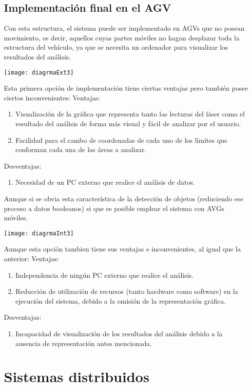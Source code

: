 \subsection{Implementación final en el AGV}
Con esta estructura, el sistema puede ser implementado en AGVs que no posean movimiento, es decir, aquellos cuyas partes móviles no hagan desplazar toda la estructura del vehículo, ya que se necesita un ordenador para visualizar los resultados del análisis.

\texttt{[image: diagrmaExt3]}

Esta primera opción de implementación tiene ciertas ventajas pero también posee ciertos inconvenientes:
Ventajas:
\begin{enumerate}
	\item Visualización de la gráfica que representa tanto las lecturas del láser como el resultado del análisis de forma más visual y fácil de analizar por el usuario.
	\item Facilidad para el cambo de coordenadas de cada uno de los límites que conforman cada una de las áreas a analizar.
\end{enumerate}
Desventajas:
\begin{enumerate}
	\item Necesidad de un PC externo que realice el análisis de datos.
\end{enumerate}

Aunque si se obvia esta característica de la detección de objetos (reduciendo ese proceso a datos booleanos) si que es posible emplear el sistema con AVGs móviles.

\texttt{[image: diagrmaInt3]}

Aunque esta opción tambien tiene sus ventajas e inconvenientes, al igual que la anterior:
Ventajas:
\begin{enumerate}
	\item Independencia de ningún PC externo que realice el análisis.
	\item Reducción de utilización de recursos (tanto hardware como software) en la ejecución del sistema, debido a la omisión de la representación gráfica.
\end{enumerate}
Desventajas:
\begin{enumerate}
	\item Incapacidad de visualización de los resultados del análisis debido a la ausencia de representación antes mencionada.
\end{enumerate}
\section{Sistemas distribuidos}

